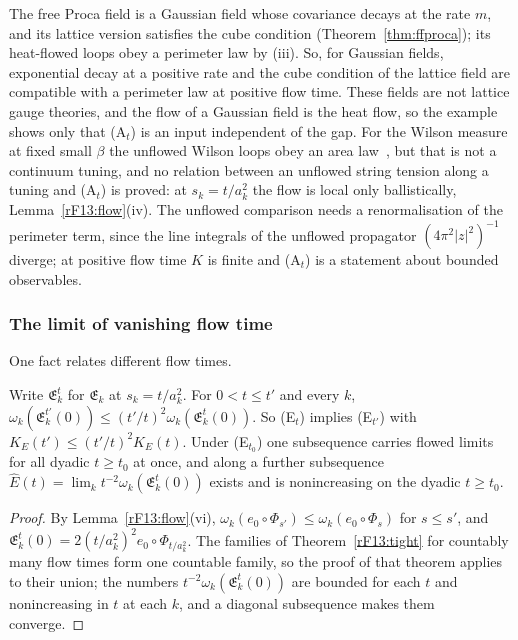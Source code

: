 The free Proca field is a Gaussian field whose covariance decays at the
rate $m$, and its lattice version satisfies the cube condition
(Theorem~\ref{thm:ffproca}); its heat-flowed loops obey a perimeter law by
(iii). So, for Gaussian fields, exponential decay at a positive rate and the
cube condition of the lattice field are compatible with a perimeter law at
positive flow time. These fields are not lattice gauge theories, and the
flow of a Gaussian field is the heat flow, so the example shows only that
(A$_t$) is an input independent of the gap. For the Wilson measure at fixed small $\beta$ the
unflowed Wilson loops obey an area law~\cite{OSei78}, but that is not a
continuum tuning, and no relation between an unflowed string tension along a
tuning and (A$_t$) is proved: at $s_k=t/a_k^2$ the flow is local only
ballistically, Lemma~\ref{rF13:flow}(iv). The unflowed comparison needs
a renormalisation of the perimeter term, since the line integrals of the
unflowed propagator $(4\pi^2|z|^2)^{-1}$ diverge; at positive flow time
$K$ is finite and (A$_t$) is a statement about bounded observables.

\subsubsection{The limit of vanishing flow time}\label{rF13:zero}

One fact relates different flow times.

\begin{lemma}\label{rF13:mono}
Write $\mathfrak E^{t}_k$ for $\mathfrak E_k$ at $s_k=t/a_k^2$. For $0<t\le
t'$ and every $k$, $\omega_k(\mathfrak E^{t'}_k(0))\le(t'/t)^2\omega_k(
\mathfrak E^{t}_k(0))$. So \textup{(E$_t$)} implies \textup{(E$_{t'}$)} with
$K_E(t')\le(t'/t)^2K_E(t)$. Under \textup{(E$_{t_0}$)} one subsequence carries
flowed limits for all dyadic $t\ge t_0$ at once, and along a further
subsequence $\hat E(t)=\lim_kt^{-2}\omega_k(\mathfrak E^t_k(0))$ exists and is
nonincreasing on the dyadic $t\ge t_0$.
\end{lemma}

\begin{proof}
By Lemma~\ref{rF13:flow}(vi), $\omega_k(e_0\circ\Phi_{s'})\le\omega_k(e_0\circ
\Phi_s)$ for $s\le s'$, and $\mathfrak E^t_k(0)=2(t/a_k^2)^2e_0\circ
\Phi_{t/a_k^2}$. The families of Theorem~\ref{rF13:tight} for countably many
flow times form one countable family, so the proof of that theorem applies
to their union; the numbers $t^{-2}\omega_k(\mathfrak E^t_k(0))$ are bounded
for each $t$ and nonincreasing in $t$ at each $k$, and a diagonal
subsequence makes them converge.
\end{proof}

